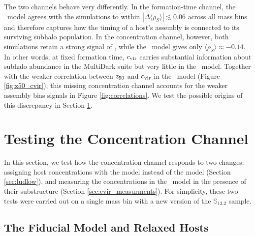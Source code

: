 \documentclass[twocolumn,apj,numberedappendix,twocolappendix,iop]{openjournal}
\begin{document}
The two channels behave very differently. In the formation-time channel, the \SatGen\ model agrees with the simulations to within $|\Delta \langle \rho_S \rangle| \lesssim 0.06$ across all mass bins and therefore captures how the timing of a host's assembly is connected to its surviving subhalo population. In the concentration channel, however, both simulations retain a strong signal of  , while the \SatGen\ model gives only $\langle \rho_S \rangle \approx -0.14$. In other words, at fixed formation time, $c_{\rm vir}$ carries substantial information about subhalo abundance in the MultiDark suite but very little in the \SatGen\ model. Together with the weaker correlation between $z_{50}$ and $c_{\rm vir}$ in the \SatGen\ model (Figure \ref{fig:z50_cvir}), this missing concentration channel accounts for the weaker assembly bias signals in Figure \ref{fig:correlations}. We test the possible origins of this discrepancy in Section \ref{sec:tests}.

\section{Testing the Concentration Channel}
\label{sec:tests}



In this section, we test how the concentration channel responds to two changes: assigning host concentrations with the \cite{Ludlow.etal.16} model  instead of the \cite{Zhao.etal.09} model  (Section \ref{sec:ludlow}), and measuring the concentrations in the \SatGen\ model in the presence of their substructure (Section \ref{sec:cvir_measurments}). For simplicity, these two tests were carried out on a single mass bin with a new version of the $\mathbb{S}_{13.2}$ sample. 

\subsection{The Fiducial Model and Relaxed Hosts}
\label{sec:fid}
\end{document}
